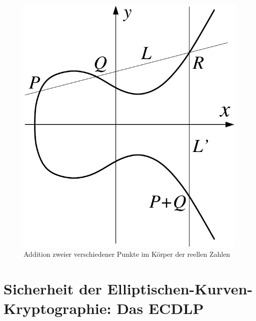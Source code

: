 \begin{refsegment}
\begin{figure}[htbp]
\begin{center}
\includegraphics[scale=0.65]{figures/ec-add}  %
\caption{Addition zweier verschiedener Punkte im Körper der reellen Zahlen} %
\end{center}
\end{figure}
\enlargethispage{+20pt}
\newpage


\section[Sicherheit der Elliptischen-Kurven-Kryptographie: Das ECDLP]{\sloppy Sicherheit der Elliptischen-Kurven-Kryptographie: Das ECDLP}


\end{refsegment}
